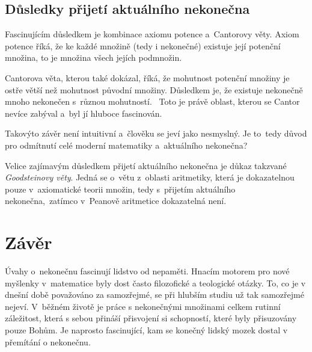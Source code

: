 \documentclass[czech]{article}
\begin{document}
\subsection*{Důsledky přijetí aktuálního nekonečna}

Fascinujícím důsledkem je kombinace axiomu potence a~Cantorovy věty. Axiom potence říká, že ke každé množině (tedy i nekonečné) existuje její potenční množina, to je množina všech jejích podmnožin.

Cantorova věta, kterou také dokázal, říká, že mohutnost potenční množiny je ostře větší než mohutnost původní množiny. Důsledkem je, že existuje nekonečně mnoho nekonečen s~různou mohutností.~\cite{vopenka_teorie_mnozin}
Toto je právě oblast, kterou se Cantor nevíce zabýval a~byl jí hluboce fascinován.

Takovýto závěr není intuitivní a~člověku se jeví jako nesmyslný. Je to~tedy důvod pro odmítnutí celé moderní matematiky a~aktuálního nekonečna? 

Velice zajímavým důsledkem přijetí aktuálního nekonečna je důkaz takzvané \textit{Goodsteinovy věty}. Jedná se o~větu z~oblasti aritmetiky, která je dokazatelnou pouze v~axiomatické teorii množin, tedy s~přijetím aktuálního nekonečna,~zatímco v~Peanově aritmetice dokazatelná není.~\cite{goodstein}

\section*{Závěr}

Úvahy o~nekonečnu fascinují lidstvo od nepaměti. Hnacím motorem pro nové myšlenky v~matematice byly dost často filozofické a teologické otázky. To, co je v dnešní době považováno za samozřejmé, se při hlubším studiu už tak samozřejmé nejeví. V~běžném životě je práce s nekonečnými množinami celkem rutinní záležitost, která s sebou přináší přisvojení si schopností, které byly přisuzovány pouze Bohům. Je naprosto fascinující, kam se konečný lidský mozek dostal v přemítání o nekonečnu.


\newpage
\end{document}
